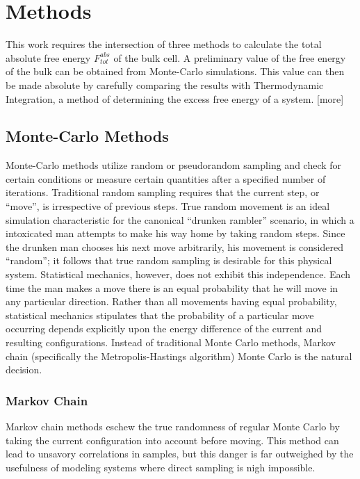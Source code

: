 \documentclass[12pt]{article}
\begin{document}

\section{Methods}
This work requires the intersection of three methods to calculate the total absolute free energy $F^{abs}_{tot}$ of the bulk cell. A preliminary value of the free energy of the bulk can be obtained from Monte-Carlo simulations. This value can then be made absolute by carefully comparing the results with Thermodynamic Integration, a method of determining the excess free energy of a system. [more] 
\subsection{Monte-Carlo Methods}
Monte-Carlo methods utilize random or pseudorandom sampling and check for certain conditions or measure certain quantities after a specified number of iterations. Traditional random sampling requires that the current step, or ``move'', is irrespective of previous steps. True random movement is an ideal simulation characteristic for the canonical ``drunken rambler'' scenario, in which a intoxicated man attempts to make his way home by taking random steps. Since the drunken man chooses his next move arbitrarily, his movement is considered ``random''; it follows that true random sampling is desirable for this physical system. Statistical mechanics, however, does not exhibit this independence. Each time the man makes a move there is an equal probability that he will move in any particular direction. Rather than all movements having equal probability, statistical mechanics stipulates that the probability of a particular move occurring depends explicitly upon the energy difference of the current and resulting configurations. Instead of traditional Monte Carlo methods, Markov chain (specifically the Metropolis-Hastings algorithm) Monte Carlo is the natural decision.
\subsubsection{Markov Chain}
Markov chain methods eschew the true randomness of regular Monte Carlo by taking the current configuration into account before moving. 
This method can lead to unsavory correlations in samples, but this danger is far outweighed by the usefulness of modeling systems where direct sampling is nigh impossible.
\begin{figure}
    \begin{tikzpicture}
    \end{tikzpicture}
\end{figure}
\end{document}

